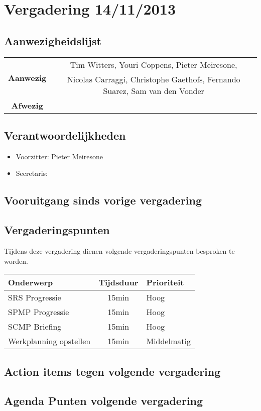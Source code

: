 \section{Vergadering 14/11/2013}
\subsection{Aanwezigheidslijst}
\begin{table}[htbp]
	\centering
	\begin{tabular}{c|c}
		\multirow{2}{*}{\textbf{Aanwezig}} & Tim Witters, Youri Coppens, Pieter Meiresone, \\
		& Nicolas Carraggi,  Christophe Gaethofs, Fernando Suarez, Sam van den Vonder \\
		\hline
		\textbf{Afwezig} & \\
	\end{tabular}
\end{table}

\subsection{Verantwoordelijkheden}
\begin{itemize}
	\item Voorzitter: Pieter Meiresone
	\item Secretaris: 
\end{itemize}

\subsection{Vooruitgang sinds vorige vergadering}
\subsection{Vergaderingspunten}
Tijdens deze vergadering dienen volgende vergaderingspunten besproken te worden.
\begin{table} [H]
	\centering
	\begin{tabular} {l|cl}
		Onderwerp & Tijdsduur & Prioriteit \\
		\hline
		SRS Progressie & 15min & Hoog \\
		SPMP Progressie & 15min & Hoog \\
		SCMP Briefing & 15min & Hoog \\
		Werkplanning opstellen & 15min & Middelmatig
	\end{tabular}
\end{table}
\subsection{Action items tegen volgende vergadering}
\subsection{Agenda Punten volgende vergadering}

